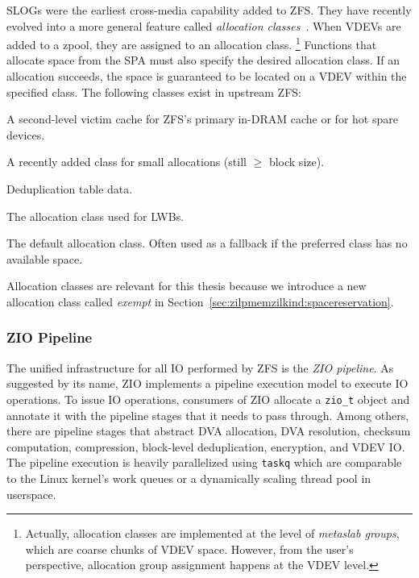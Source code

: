 \documentclass[12pt,a4paper,twoside]{book}
\begin{document}
SLOGs were the earliest cross-media capability added to ZFS.
They have recently evolved into a more general feature called \textit{allocation classes}~\cite{openzfsAllocationClasses}.
When VDEVs are added to a zpool, they are assigned to an allocation class.%
\footnote{
 Actually, allocation classes are implemented at the level of \textit{metaslab groups}, which are coarse chunks of VDEV space.
 However, from the user's perspective, allocation group assignment happens at the VDEV level.
}
Functions that allocate space from the SPA must also specify the desired allocation class.
If an allocation succeeds, the space is guaranteed to be located on a VDEV within the specified class.
The following classes exist in upstream ZFS:
\begin{description}[noitemsep,leftmargin=1.5cm,labelindent=1cm]
    \item[aux] A second-level victim cache for ZFS's primary in-DRAM cache or for hot spare devices.
    \item[special] A recently added class for small allocations (still $\ge$ block size).
    \item[dedup] Deduplication table data.
    \item[log] The allocation class used for LWBs.
    \item[normal] The default allocation class. Often used as a fallback if the preferred class has no available space.
\end{description}
Allocation classes are relevant for this thesis because we introduce a new allocation class called \textit{exempt} in Section~\ref{sec:zilpmemzilkind:spacereservation}.

\subsubsection{ZIO Pipeline}

The unified infrastructure for all IO performed by ZFS is the \textit{ZIO pipeline}.
As suggested by its name, ZIO implements a pipeline execution model to execute IO operations.
To issue IO operations, consumers of ZIO allocate a \lstinline{zio_t} object and annotate it with the pipeline stages that it needs to pass through.
Among others, there are pipeline stages that abstract DVA allocation, DVA resolution, checksum computation, compression, block-level deduplication, encryption, and VDEV IO.
The pipeline execution is heavily parallelized using \lstinline{taskq} which are comparable to the Linux kernel's work queues or a dynamically scaling thread pool in userspace.
\end{document}
